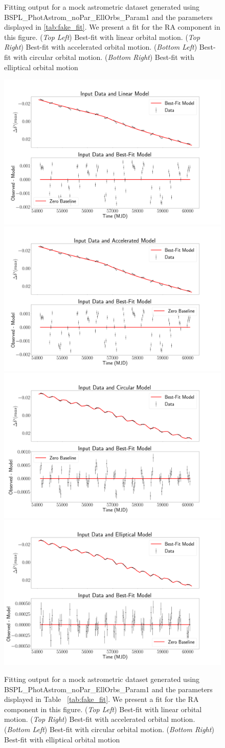 \documentclass[twocolumn]{aastex701}
\begin{document}
\begin{figure}
    \caption{Fitting output for a mock astrometric dataset generated using  BSPL\_PhotAstrom\_noPar\_EllOrbs\_Param1 and the parameters displayed in \autoref{tab:fake_fit}. We present a fit for the RA component in this figure. 
    (\emph{Top Left}) Best-fit with linear orbital motion. (\emph{Top Right}) Best-fit with accelerated orbital motion. (\emph{Bottom Left}) Best-fit with circular orbital motion. (\emph{Bottom Right}) Best-fit with elliptical orbital motion}
    \label{fig:orbital_comparison_as1}
\end{figure}


\begin{figure}
    \centering
    \includegraphics[width= .48 \textwidth]{figures/LinAnalAst2.png}
    \includegraphics[width= .48 \textwidth]{figures/AccAnalAst2.png}
    \includegraphics[width= .48\textwidth]{figures/CircAnalAst2.png}
    \includegraphics[width= .48\textwidth]{figures/EllAnalAst2.png}

    \caption{Fitting output for a mock astrometric dataset generated using  BSPL\_PhotAstrom\_noPar\_EllOrbs\_Param1 and the parameters displayed in Table ~\ref{tab:fake_fit}. We present a fit for the RA component in this figure. 
    (\emph{Top Left}) Best-fit with linear orbital motion. (\emph{Top Right}) Best-fit with accelerated orbital motion. (\emph{Bottom Left}) Best-fit with circular orbital motion. (\emph{Bottom Right}) Best-fit with elliptical orbital motion}
    \label{fig:orbital_comparison_as2}
\end{figure}
\end{document}
